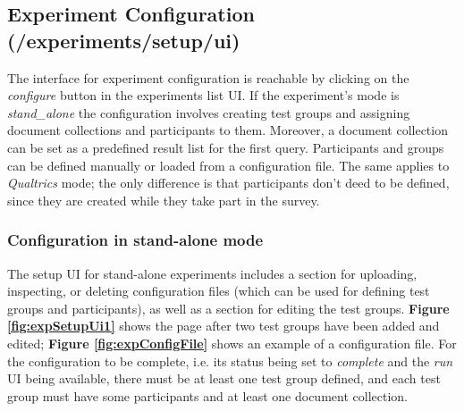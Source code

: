 \documentclass[a4paper]{usiinfbachelorproject}
\begin{document}
\begin{appendices}
        \subsection{Experiment Configuration \small{(/experiments/setup/ui)}}

        The interface for experiment configuration is reachable by clicking on the \emph{configure} button in the
        experiments list UI. If the experiment's mode is \emph{stand\_alone} the configuration involves creating test groups and assigning 
        document collections and participants to them. Moreover, a document collection can be set as a predefined result list for the first query.
        Participants and groups can be defined manually or loaded from a configuration file. The same applies to \emph{Qualtrics} mode; the only difference is that 
        participants don't deed to be defined, since they are created while
        they take part in the survey.

        \subsubsection{Configuration in stand-alone mode}

        The setup UI for stand-alone experiments includes a section for uploading, inspecting, or deleting configuration files (which can be used for
        defining test groups and participants), as well as a section for editing the test groups. \textbf{Figure \ref{fig:expSetupUi1}}
        shows the page after two test groups have been added and edited; \textbf{Figure \ref{fig:expConfigFile}} shows an example of a configuration file. 
        For the configuration to be complete, i.e. its status being set to 
        \emph{complete} and the \emph{run} UI being available, there must be at least one test group defined, and each test group must 
        have some participants and at least one document collection.


\end{appendices}
\end{document}
